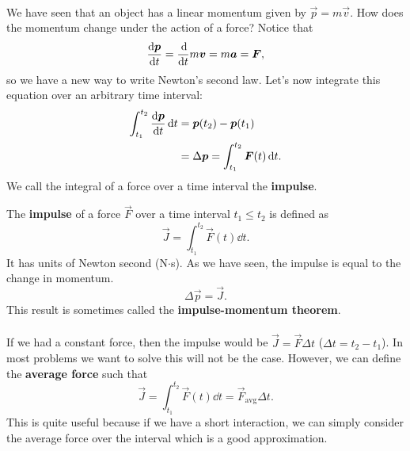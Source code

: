 \documentclass[../classical_mechanics.tex]{subfiles}
\begin{document}
        \paragraph{}
        We have seen that an object has a linear momentum given by $\vec{p}=m\vec{v}$.
        How does the momentum change under the action of a force?
        Notice that
        \begin{equation}
            \dv{\vec{p}}{t}=\dv{}{t}m\vec{v}=m\vec{a}=\vec{F},
        \end{equation}
        so we have a new way to write Newton's second law.
        Let's now integrate this equation over an arbitrary time interval:
        \begin{align}
            \int_{t_1}^{t_2}\dv{\vec{p}}{t}\dd{t}&=\vec{p}(t_2)-\vec{p}(t_1)\\
            &=\Delta\vec{p}=\int_{t_1}^{t_2}\vec{F}(t)\dd{t}.
        \end{align}
        We call the integral of a force over a time interval the \textbf{impulse}.
        \begin{definition}
            The \textbf{impulse} of a force $\vec{F}$ over a time interval $t_1\leq t_2$ is defined as
            \begin{equation}
                \vec{J}=\int_{t_1}^{t_2}\vec{F}(t)\dd{t}.
            \end{equation}
            It has units of Newton second (N$\cdot$s). As we have seen, the impulse is equal to the change in momentum.
            \begin{equation}
                \Delta\vec{p}=\vec{J}.
            \end{equation}
            This result is sometimes called the \textbf{impulse-momentum theorem}.
        \end{definition}

        \paragraph{}
        If we had a constant force, then the impulse would be $\vec{J}=\vec{F}\Delta t$ ($\Delta t=t_2-t_1$).
        In most problems we want to solve this will not be the case. However, we can define the \textbf{average force} such that
        \begin{equation}
            \vec{J}=\int_{t_1}^{t_2}\vec{F}(t)\dd{t}=\vec{F}_\text{avg}\Delta t.
        \end{equation}
        This is quite useful because if we have a short interaction, we can simply consider the average force over the interval which is a good approximation.
\end{document}
